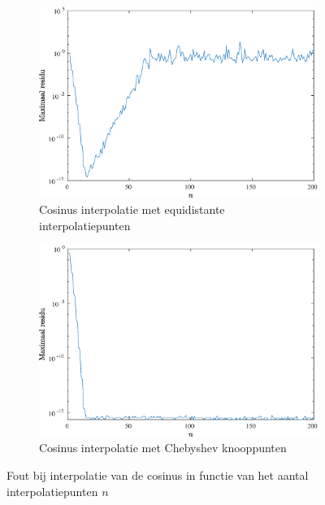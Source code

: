 \documentclass[a4paper, 12pt, titlepage, fleqn]{article}
\begin{document}
\begin{figure}
\begin{subfigure}[b]{0.45\textwidth}
\includegraphics[width=\linewidth]{../Afbeeldingen/cos_equi_fout.eps}
\caption{Cosinus interpolatie met equidistante interpolatiepunten}
\end{subfigure}
\hfill
\begin{subfigure}[b]{0.45\textwidth}
\includegraphics[width=\linewidth]{../Afbeeldingen/cos_nul_fout.eps}
\caption{Cosinus interpolatie met Chebyshev knooppunten}
\end{subfigure}
\caption{Fout bij interpolatie van de cosinus in functie van het aantal interpolatiepunten $n$}
\label{fig:cosFout}
\end{figure}
\end{document}
